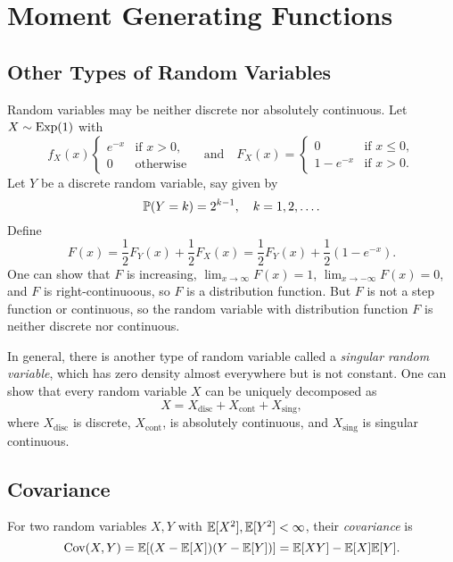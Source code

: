 \chapter{Moment Generating Functions}

\section{Other Types of Random Variables}
\begin{remark}
  Random variables may be neither discrete nor
  absolutely continuous. Let $X \sim \operatorname{Exp}(1)$ with
  \[
    f_X(x)
    \begin{cases}
      e^{-x} & \text{if $x > 0$}, \\
      0 & \text{otherwise}
    \end{cases}
    \quad \text{and} \quad
    F_X(x) =
    \begin{cases}
      0 & \text{if $x \leq 0$}, \\
      1 - e^{-x} & \text{if $x > 0$}.
    \end{cases}
  \]
  Let $Y$ be a discrete random variable, say
  given by
  \[
    \mathbb{P}(Y = k) = 2^{k - 1}, \quad k = 1, 2, \ldots.
  \]
  Define
  \[
    F(x) = \frac{1}{2} F_Y(x) + \frac{1}{2} F_X(x)
    = \frac{1}{2} F_Y(x) + \frac{1}{2}(1 - e^{-x}).
  \]
  One can show that
  $F$ is increasing, $\lim_{x \to \infty} F(x) = 1$,
  $\lim_{x \to -\infty} F(x) = 0$, and $F$ is
  right-continuoous, so $F$ is a distribution function.
  But $F$ is not a step function or continuous, so
  the random variable with distribution function
  $F$ is neither discrete nor continuous.
\end{remark}

\begin{remark}
  In general, there is another type of random
  variable called a \emph{singular random variable},
  which has zero density almost everywhere but is
  not constant. One can show that every random
  variable $X$ can be uniquely decomposed as
  \[
    X = X_{\text{disc}} + X_{\text{cont}} + X_{\text{sing}},
  \]
  where $X_{\text{disc}}$ is discrete, $X_{\text{cont}}$,
  is absolutely continuous, and
  $X_{\text{sing}}$ is singular continuous.
\end{remark}

\section{Covariance}
\begin{definition}
  For two random variables $X, Y$ with
  $\mathbb{E}[X^2], \mathbb{E}[Y^2] < \infty$, their \emph{covariance}
  is
  \[
    \operatorname{Cov}(X, Y) = \mathbb{E}[(X - \mathbb{E}[X])(Y - \mathbb{E}[Y])]
    = \mathbb{E}[XY] - \mathbb{E}[X]\mathbb{E}[Y].
  \]
\end{definition}

